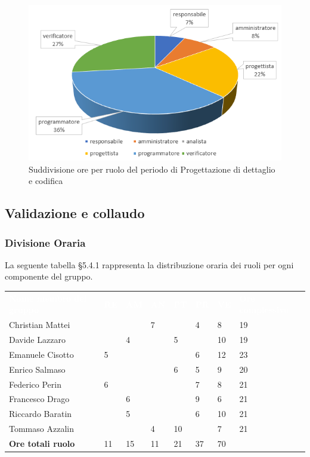 \begin{figure}[h]
	\centering
	\includegraphics[scale=2]{sezioni/Aerogrammi/AerogrammaDiDettaglio.png}
	\caption{Suddivisione ore per ruolo del periodo di Progettazione di dettaglio e codifica}
\end{figure}

\subsection{Validazione e collaudo}

\subsubsection{Divisione Oraria}
La seguente tabella §5.4.1 rappresenta la distribuzione oraria dei ruoli per ogni componente del gruppo.
{
	\renewcommand{\arraystretch}{2}
	\centering
	\begin{longtable}{ C{5cm} C{1cm} C{1cm} C{1cm} C{1cm} C{1cm} C{1cm} C{3cm}}
		\textcolor{white}{\textbf{Nome membro del gruppo}} & \textcolor{white}{\textbf{RE}} & \textcolor{white}{\textbf{AM}} & \textcolor{white}{\textbf{AN}} & \textcolor{white}{\textbf{PT}} & \textcolor{white}{\textbf{PR}} & \textcolor{white}{\textbf{VE}} & \textcolor{white}{\textbf{Ore complessive}}\\	
        
        Christian Mattei & & & 7 & & 4 & 8 & 19\\
        Davide Lazzaro & & 4 & & 5 & & 10 & 19\\
        Emanuele Cisotto & 5 & & & & 6 & 12 & 23\\ 
        Enrico Salmaso & & & & 6 & 5 & 9 & 20 \\
        Federico Perin & 6 & & & & 7 & 8 & 21\\
        Francesco Drago & & 6 & & & 9 & 6 & 21\\
        Riccardo Baratin & & 5 & & & 6 & 10 & 21\\
        Tommaso Azzalin & & & 4 & 10 & & 7 & 21\\
        \textbf{Ore totali ruolo} & 11 & 15 & 11 & 21 & 37 & 70 & \\
		
	\end{longtable}
}


